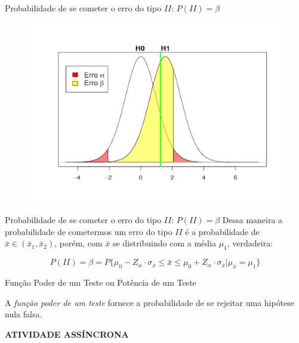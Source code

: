 \documentclass[hyperref={pdfpagelabels=false}]{beamer}
\begin{document}
\begin{frame}{Probabilidade de se cometer o erro do tipo $II$: $P(II) = \beta$}
	\begin{figure}
		\centering
		\includegraphics[width=0.9\linewidth]{erro2}
		\label{fig:teste2}
	\end{figure}
\end{frame}

\begin{frame}{Probabilidade de se cometer o erro do tipo $II$: $P(II) = \beta$}
Dessa maneira a probabilidade de cometermos um erro do tipo $II$ é a probabilidade de $\bar{x} \in (\bar{x}_1,\bar{x}_2)$, porém, com $\bar{x}$ se distribuindo com a média $\mu_1$, verdadeira: \pause


$$P(II) = \beta = P\{ \mu_0 - Z_{\alpha} \cdot \sigma_{\bar{x}} \leq \bar{x} \leq \mu_0 + Z_{\alpha} \cdot \sigma_{\bar{x}} | \mu_{\bar{x}} = \mu_1 \}$$
	
\end{frame}

\begin{frame}{Função Poder de um Teste ou Potência de um Teste}

A \emph{função poder de um teste} fornece a probabilidade de se rejeitar uma hipótese nula falsa. \pause

{\bf ATIVIDADE ASSÍNCRONA}
	
\end{frame}
\end{document}

